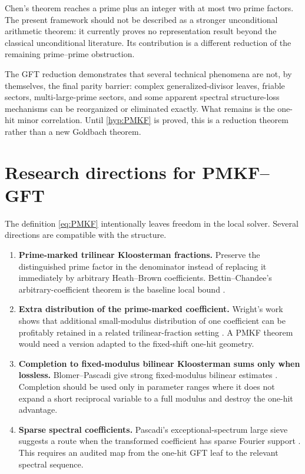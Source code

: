\documentclass[11pt]{article}
\theoremstyle{definition}
\theoremstyle{remark}
\newcommand{\1}{\mathbf 1}
\begin{document}
Chen's theorem reaches a prime plus an integer with at most two prime factors.  The present framework should not be described as a stronger unconditional arithmetic theorem: it currently proves no representation result beyond the classical unconditional literature.  Its contribution is a different reduction of the remaining prime--prime obstruction.

The GFT reduction demonstrates that several technical phenomena are not, by themselves, the final parity barrier: complex generalized-divisor leaves, friable sectors, multi-large-prime sectors, and some apparent spectral structure-loss mechanisms can be reorganized or eliminated exactly.  What remains is the one-hit minor correlation.  Until \cref{hyp:PMKF} is proved, this is a reduction theorem rather than a new Goldbach theorem.

\section{Research directions for PMKF--GFT}

The definition \eqref{eq:PMKF} intentionally leaves freedom in the local solver.  Several directions are compatible with the structure.

\begin{enumerate}[label=\textbf{\arabic*.},leftmargin=2.3em]
\item \textbf{Prime-marked trilinear Kloosterman fractions.}  Preserve the distinguished prime factor in the denominator instead of replacing it immediately by arbitrary Heath--Brown coefficients.  Bettin--Chandee's arbitrary-coefficient theorem is the baseline local bound \cite{BC}.
\item \textbf{Extra distribution of the prime-marked coefficient.}  Wright's work shows that additional small-modulus distribution of one coefficient can be profitably retained in a related trilinear-fraction setting \cite{Wright}.  A PMKF theorem would need a version adapted to the fixed-shift one-hit geometry.
\item \textbf{Completion to fixed-modulus bilinear Kloosterman sums only when lossless.}  Blomer--Pascadi give strong fixed-modulus bilinear estimates \cite{BP}.  Completion should be used only in parameter ranges where it does not expand a short reciprocal variable to a full modulus and destroy the one-hit advantage.
\item \textbf{Sparse spectral coefficients.}  Pascadi's exceptional-spectrum large sieve suggests a route when the transformed coefficient has sparse Fourier support \cite{PascadiLS}.  This requires an audited map from the one-hit GFT leaf to the relevant spectral sequence.
\end{enumerate}
\end{document}
